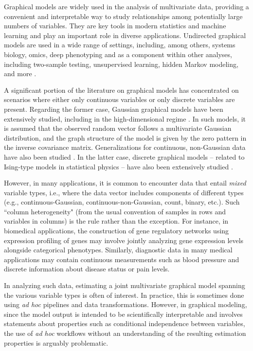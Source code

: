Graphical models are widely used in the analysis of multivariate data, providing a convenient and interpretable way to study relationships among potentially large numbers of variables. They are key tools in modern statistics and machine learning and play an important role in diverse applications. Undirected graphical models are used in a wide range of settings, including, among others, systems biology, omics, deep phenotyping \cite[see, e.g.][]{dobra2004, Finegold11, monti2014}
and as a component within other analyses, including two-sample testing, unsupervised learning, hidden Markov modeling, and more \cite[examples include][]{wei2007,verzelen2009,stadler2013, stadler2015,perrakis2021}.

A significant portion of the literature on graphical models has concentrated on scenarios where either only continuous variables or only discrete variables are present. Regarding the former case, Gaussian graphical models have been extensively studied, including in the high-dimensional regime \cite[see among others][]{Meinshausen06, Friedman08, Banerjee08, Lam09, Yuan10, Ravikumar11, Cai11}. In such models, it is assumed that the observed random vector follows a multivariate Gaussian distribution, and the graph structure of the model is given by the zero pattern in the inverse covariance matrix. Generalizations for continuous, non-Gaussian data have also been studied \cite{Miyamura06, Liu09, Finegold11}. In the latter case, discrete graphical models -- related to Ising-type models in statistical physics -- have also been extensively studied \cite[see, e.g.][]{wainwright2006, ravikumar2010}.

However, in many applications, it is common to encounter data that entail \textit{mixed} variable types, i.e., where the data vector includes components of different types (e.g., continuous-Gaussian, continuous-non-Gaussian, count, binary, etc.). Such ``column heterogeneity" (from the usual convention of samples in rows and variables in columns) is the rule rather than the exception. For instance, in biomedical  applications, the construction of gene regulatory networks using expression profiling of genes may involve jointly analyzing gene expression levels alongside categorical phenotypes. Similarly, diagnostic data in many medical applications may contain continuous measurements such as blood pressure and discrete information about disease status or pain levels.

In analyzing such data, estimating a joint multivariate graphical model spanning the various variable types is often of interest. In practice, this is sometimes done using \textit{ad hoc} pipelines and data transformations. However, in graphical modeling, since the model output is intended to be scientifically interpretable and involves statements about properties such as conditional independence between variables, the use of \textit{ad hoc} workflows without an understanding of the resulting estimation properties is arguably problematic.

